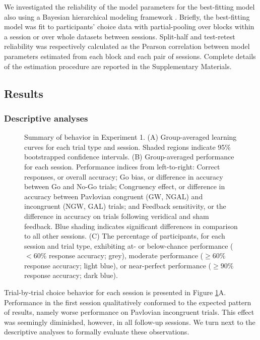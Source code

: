 \documentclass[a4paper,12pt]{article}
\begin{document}
\begin{refsection}[main]
We investigated the reliability of the model parameters for the best-fitting model also using a Bayesian hierarchical modeling framework \cite{rouder2019psychometrics}. Briefly, the best-fitting model was fit to participants' choice data with partial-pooling over blocks within a session or over whole datasets between sessions. Split-half and test-retest reliability was respectively calculated as the Pearson correlation between model parameters estimated from each block and each pair of sessions. Complete details of the estimation procedure are reported in the Supplementary Materials.

\subsection*{Results}

\subsubsection*{Descriptive analyses}

\begin{figure}[hpt]
    \centerline{}
    \caption{Summary of behavior in Experiment 1. (A) Group-averaged learning curves for each trial type and session. Shaded regions indicate 95\% bootstrapped confidence intervals. (B) Group-averaged performance for each session. Performance indices from left-to-right: Correct responses, or overall accuracy; Go bias, or difference in accuracy between Go and No-Go trials; Congruency effect, or difference in accuracy between Pavlovian congruent (GW, NGAL) and incongruent (NGW, GAL) trials; and Feedback sensitivity, or the difference in accuracy on trials following veridical and sham feedback. Blue shading indicates significant differences in comparison to all other sessions. (C) The percentage of participants, for each session and trial type, exhibiting at- or below-chance performance ($< 60\%$ response accuracy; grey), moderate performance ($\geq 60\%$ response accuracy; light blue), or near-perfect performance ($\geq 90\%$ response accuracy; dark blue).}
    \label{fig:exp01_behavior}
\end{figure}

Trial-by-trial choice behavior for each session is presented in Figure \ref{fig:exp01_behavior}A. Performance in the first session qualitatively conformed to the expected pattern of results, namely worse performance on Pavlovian incongruent trials. This effect was seemingly diminished, however, in all follow-up sessions. We turn next to the descriptive analyses to formally evaluate these observations. 


\end{refsection}
\end{document}
